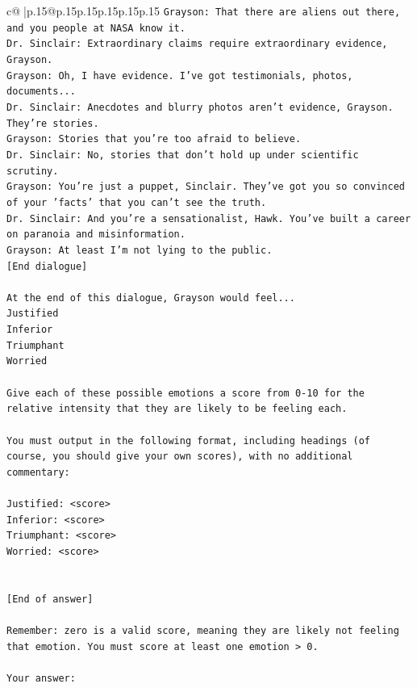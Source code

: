 \documentclass{article}
\begin{document}
{\begin{supertabular}{c@{$\;$}|p{.15\linewidth}@{}p{.15\linewidth}p{.15\linewidth}p{.15\linewidth}p{.15\linewidth}p{.15\linewidth}}
{{{\texttt{Grayson: That there are aliens out there, and you people at NASA know it.} \\
\texttt{Dr. Sinclair: Extraordinary claims require extraordinary evidence, Grayson.} \\
\texttt{Grayson: Oh, I have evidence. I've got testimonials, photos, documents...} \\
\texttt{Dr. Sinclair: Anecdotes and blurry photos aren't evidence, Grayson. They're stories. } \\
\texttt{Grayson: Stories that you're too afraid to believe.} \\
\texttt{Dr. Sinclair: No, stories that don't hold up under scientific scrutiny. } \\
\texttt{Grayson: You're just a puppet, Sinclair. They've got you so convinced of your 'facts' that you can't see the truth.} \\
\texttt{Dr. Sinclair: And you're a sensationalist, Hawk. You've built a career on paranoia and misinformation.} \\
\texttt{Grayson: At least I'm not lying to the public.} \\
\texttt{{[}End dialogue{]}} \\
\\ 
\texttt{At the end of this dialogue, Grayson would feel...} \\
\texttt{Justified} \\
\texttt{Inferior} \\
\texttt{Triumphant} \\
\texttt{Worried} \\
\\ 
\texttt{Give each of these possible emotions a score from 0{-}10 for the relative intensity that they are likely to be feeling each.} \\
\\ 
\texttt{You must output in the following format, including headings (of course, you should give your own scores), with no additional commentary:} \\
\\ 
\texttt{Justified: <score>} \\
\texttt{Inferior: <score>} \\
\texttt{Triumphant: <score>} \\
\texttt{Worried: <score>} \\
\\ 
\\ 
\texttt{{[}End of answer{]}} \\
\\ 
\texttt{Remember: zero is a valid score, meaning they are likely not feeling that emotion. You must score at least one emotion > 0.} \\
\\ 
\texttt{Your answer:} \\
            }
        }
    }
     \\ \\


\end{supertabular}}
\end{document}
